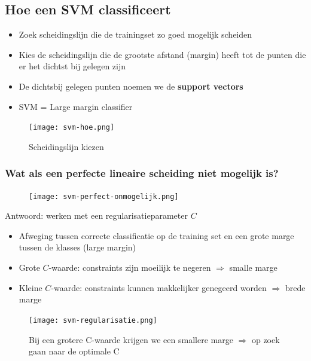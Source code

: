 \documentclass{article}
\begin{document}
\subsection{Hoe een SVM classificeert}

\begin{itemize}
    \item Zoek scheidingslijn die de trainingset zo goed mogelijk scheiden
    \item Kies de scheidingslijn die de grootste afstand (margin) heeft tot de punten die er het dichtst bij gelegen zijn
    \item De dichtsbij gelegen punten noemen we de \textbf{support vectors}
    \item SVM = Large margin classifier
\end{itemize}

\begin{figure}[H]
    \centering
    \texttt{[image: svm-hoe.png]}
    \caption{Scheidingslijn kiezen}
\end{figure}

\subsubsection{Wat als een perfecte lineaire scheiding niet mogelijk is?}

\begin{figure}[H]
    \centering
    \texttt{[image: svm-perfect-onmogelijk.png]}
    \caption{}
\end{figure}

Antwoord: werken met een regularisatieparameter $C$

\begin{itemize}
    \item Afweging tussen correcte classificatie op de training set en een grote marge tussen de klasses (large margin)
    \item Grote $C$-waarde: constraints zijn moeilijk te negeren $\Rightarrow$ smalle marge
    \item Kleine $C$-waarde: constraints kunnen makkelijker genegeerd worden $\Rightarrow$ brede marge
\end{itemize}

\begin{figure}[H]
    \centering
    \texttt{[image: svm-regularisatie.png]}
    \caption{Bij een grotere C-waarde krijgen we een smallere marge $\Rightarrow$ op zoek gaan naar de optimale C}
\end{figure}
\end{document}

